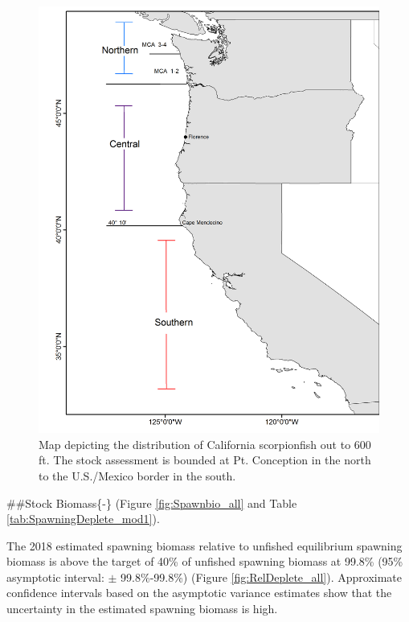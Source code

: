 \documentclass[12pt,]{article}
\begin{document}
\begin{figure}
\centering
\includegraphics{Figures/assess_region_map.png}
\caption{Map depicting the distribution of California scorpionfish out
to 600 ft. The stock assessment is bounded at Pt. Conception in the
north to the U.S./Mexico border in the south.
\label{fig:assess_region_map}}
\end{figure}

\FloatBarrier

\#\#Stock Biomass\{-\} (Figure \ref{fig:Spawnbio_all} and Table
\ref{tab:SpawningDeplete_mod1}).

The 2018 estimated spawning biomass relative to unfished equilibrium
spawning biomass is above the target of 40\% of unfished spawning
biomass at 99.8\% (95\% asymptotic interval: \(\pm\) 99.8\%-99.8\%)
(Figure \ref{fig:RelDeplete_all}). Approximate confidence intervals
based on the asymptotic variance estimates show that the uncertainty in
the estimated spawning biomass is high.

\FloatBarrier
\end{document}
